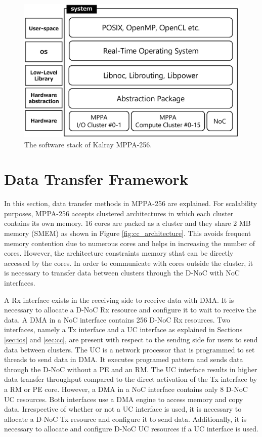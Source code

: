 \documentclass{sig-alternate-05-2015}
\begin{document}
\begin{figure}[t]
  \centering
  \includegraphics[width=1.0\linewidth]{../figure/softwarestack.eps}
  \caption{\label{fig:software_stack}
    The software stack of Kalray MPPA-256.}
\end{figure}


\section{Data Transfer Framework}
\label{sec:framework}
In this section, data transfer methods in MPPA-256 are explained.
For scalability purposes, MPPA-256 accepts clustered architectures in which each cluster contains its own memory.
16 cores are packed as a cluster and they share 2 MB memory (SMEM) as shown in Figure \ref{fig:cc_architecture}.
This avoids frequent memory contention due to numerous cores and helps in increasing the number of cores.
However, the architecture constraints memory sthat can be directly accessed by the cores.
In order to communicate with cores outside the cluster, it is necessary to transfer data between clusters through the D-NoC with NoC interfaces.

A Rx interface exists in the receiving side to receive data with DMA.
It is necessary to allocate a D-NoC Rx resource and configure it to wait to receive the data.
A DMA in a NoC interface contains 256 D-NoC Rx resources.
Two interfaces, namely a Tx interface and a UC interface as explained in Sections \ref{sec:ios} and \ref{sec:cc},
are present with respect to the sending side for users to send data between clusters.
The UC is a network processor that is programmed to set threads to send data in DMA.
It executes programed pattern and sends data through the D-NoC without a PE and an RM.
The UC interface results in higher data transfer throughput compared to the direct activation of the Tx interface by a RM or PE core.
However, a DMA in a NoC interface contains only 8 D-NoC UC resources.
Both interfaces use a DMA engine to access memory and copy data.
Irrespective of whether or not a UC interface is used, it is necessary to allocate a D-NoC Tx resource and configure it to send data.
Additionally, it is necessary to allocate and configure D-NoC UC resources if a UC interface is used.
\end{document}
